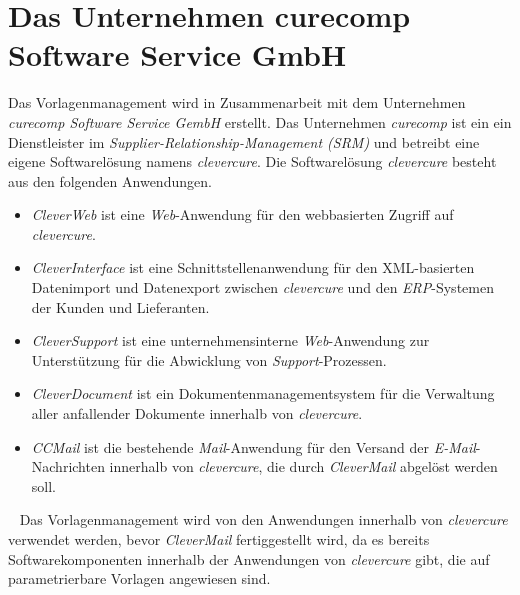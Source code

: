 \section{Das Unternehmen curecomp Software Service GmbH}
Das Vorlagenmanagement wird in Zusammenarbeit mit dem Unternehmen \emph{curecomp Software Service GembH} erstellt. Das Unternehmen \emph{curecomp} ist ein ein Dienstleister im \emph{Supplier-Relationship-Management (SRM)} und betreibt eine eigene Softwarelösung namens \emph{clevercure}. Die Softwarelösung \emph{clevercure} besteht aus den folgenden Anwendungen.
\newline
\begin{itemize}
	\item\emph{CleverWeb} 
	\newline
	ist eine \emph{Web}-Anwendung für den webbasierten Zugriff auf \emph{clevercure}.
	\item\emph{CleverInterface} 
	\newline
	ist eine Schnittstellenanwendung für den XML-basierten Datenimport und Datenexport zwischen \emph{clevercure} und den \emph{ERP}-Systemen der Kunden und Lieferanten.
	\item\emph{CleverSupport} 
	\newline
	ist eine unternehmensinterne \emph{Web}-Anwendung zur Unterstützung für die Abwicklung von \emph{Support}-Prozessen.
	\item\emph{CleverDocument} 
	\newline
	ist ein Dokumentenmanagementsystem für die Verwaltung aller anfallender Dokumente innerhalb von \emph{clevercure}.
	\item\emph{CCMail} 
	\newline
	ist die bestehende \emph{Mail}-Anwendung für den Versand der \emph{E-Mail}-Nachrichten innerhalb von \emph{clevercure}, die durch \emph{CleverMail} abgelöst werden soll.
\end{itemize}
\ \newline
Das Vorlagenmanagement wird von den Anwendungen innerhalb von \emph{clevercure} verwendet werden, bevor \emph{CleverMail} fertiggestellt wird, da es bereits Softwarekomponenten innerhalb der Anwendungen von \emph{clevercure} gibt, die auf parametrierbare Vorlagen angewiesen sind.

